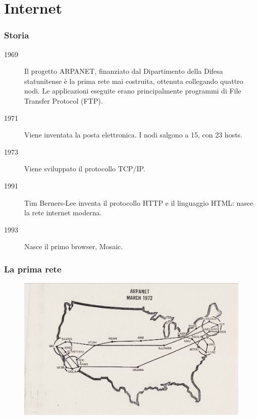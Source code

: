 \documentclass[]{beamer}
\begin{document}
\section{Internet}


\begin{frame}
\frametitle{Storia}
\begin{description}
  \item[1969] Il progetto ARPANET, finanziato dal Dipartimento della Difesa statunitense è la prima rete mai costruita, ottenuta collegando quattro nodi. Le applicazioni eseguite erano principalmente programmi di File Transfer Protocol (FTP).\pause
  \item[1971] Viene inventata la posta elettronica. I nodi salgono a 15, con 23 hosts.\pause
  \item[1973] Viene sviluppato il protocollo TCP/IP.\pause
  \item[1991] Tim Berners-Lee inventa il protocollo HTTP e il linguaggio HTML: nasce la rete internet moderna.\pause
  \item[1993] Nasce il primo browser, Mosaic.
\end{description}
\end{frame}

\begin{frame}
\frametitle{La prima rete}
\begin{figure}
    \includegraphics[width=.9\columnwidth]{img/arpanet.png}
  \end{figure}
\end{frame}
\end{document}
